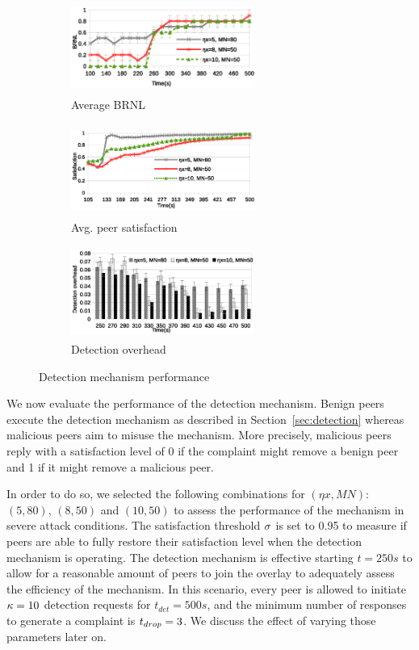 \begin{figure}[tb]
  \centering
  \begin{subfigure}[t]{0.32\textwidth}
    \centering
    \includegraphics[width=6cm,height=3cm]{./Figures/det-BRNL1.eps}
    \caption{Average BRNL}%
    \label{subfig:BRNL}
  \end{subfigure}
  \begin{subfigure}[t]{0.32\textwidth}
    \centering
    \includegraphics[width=6cm,height=3cm]{./Figures/det-sat.eps}
    \caption{Avg. peer satisfaction}%
    \label{subfig:det-sat}
  \end{subfigure}
  \begin{subfigure}[t]{0.32\textwidth}
    \centering
    \includegraphics[width=6cm,height=3cm]{./Figures/overhead.eps}
    \caption{Detection overhead}%
    \label{subfig:overhead}
  \end{subfigure}
  \caption{Detection mechanism performance}%
  \label{fig:detection-results}
   \vspace{-4.5mm}
\end{figure}


We now evaluate the performance of the detection mechanism.
Benign peers execute the detection mechanism as described in Section~\ref{sec:detection} whereas malicious peers aim to misuse the mechanism.
More precisely, malicious peers reply with a satisfaction level of 0 if the complaint might remove a benign peer and 1 if it might remove a malicious peer. 

In order to do so, we selected the following combinations for $(\eta x, MN)$: $(5, 80)$, $(8, 50)$ and $(10, 50)$ to assess the performance of the mechanism in severe attack conditions.
The satisfaction threshold $\sigma$ is set to 0.95 to measure if peers are able to fully restore their satisfaction level when the detection mechanism is operating.
The detection mechanism is effective starting $t=250s$ to allow for a reasonable amount of peers to join the overlay to adequately assess the efficiency of the mechanism.
In this scenario, every peer is allowed to initiate $\kappa=10$ detection requests for $t_{det}=500s$, and the minimum number of responses to generate a complaint is $t_{drop}=3$. 
We discuss the effect of varying those parameters later on.

